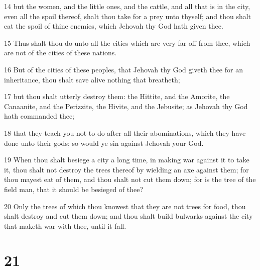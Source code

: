 \par 14 but the women, and the little ones, and the cattle, and all that is in the city, even all the spoil thereof, shalt thou take for a prey unto thyself; and thou shalt eat the spoil of thine enemies, which Jehovah thy God hath given thee.
\par 15 Thus shalt thou do unto all the cities which are very far off from thee, which are not of the cities of these nations.
\par 16 But of the cities of these peoples, that Jehovah thy God giveth thee for an inheritance, thou shalt save alive nothing that breatheth;
\par 17 but thou shalt utterly destroy them: the Hittite, and the Amorite, the Canaanite, and the Perizzite, the Hivite, and the Jebusite; as Jehovah thy God hath commanded thee;
\par 18 that they teach you not to do after all their abominations, which they have done unto their gods; so would ye sin against Jehovah your God.
\par 19 When thou shalt besiege a city a long time, in making war against it to take it, thou shalt not destroy the trees thereof by wielding an axe against them; for thou mayest eat of them, and thou shalt not cut them down; for is the tree of the field man, that it should be besieged of thee?
\par 20 Only the trees of which thou knowest that they are not trees for food, thou shalt destroy and cut them down; and thou shalt build bulwarks against the city that maketh war with thee, until it fall.

\chapter{21}


